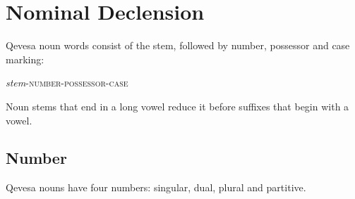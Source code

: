 \documentclass[grammar]{subfiles}
\begin{document}







\section{Nominal Declension}
\label{sec:nm_declension}

Qevesa noun words consist of the stem, followed by number, possessor and case marking:

\begin{exe}
  \ex\label{ex:nm_structure} \textit{stem}\textsc{-number-possessor-case}
\end{exe}

Noun stems that end in a long vowel reduce it before suffixes that begin with a vowel. 

\subsection{Number}
\label{ssec:nm_number}

Qevesa nouns have four numbers: singular, dual, plural and partitive.
\end{document}

